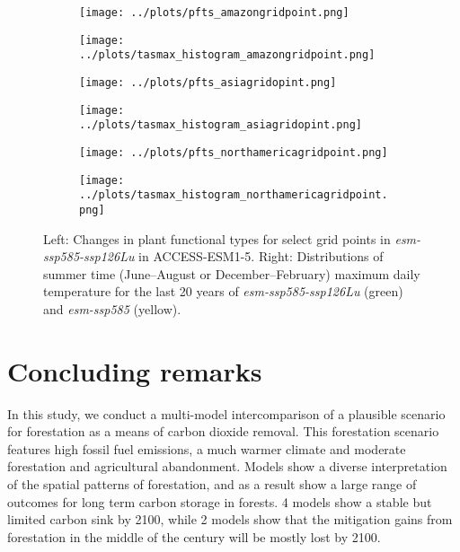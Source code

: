\documentclass[]{article}
\begin{document}
\begin{figure}[H]
    \centering
    \begin{subfigure}[b]{0.4\linewidth}
        \texttt{[image: ../plots/pfts\_amazongridpoint.png]}
    \end{subfigure}
    \begin{subfigure}[b]{0.4\linewidth}
        \texttt{[image: ../plots/tasmax\_histogram\_amazongridpoint.png]}
    \end{subfigure}
    \begin{subfigure}[b]{0.4\linewidth}
        \texttt{[image: ../plots/pfts\_asiagridopint.png]}
    \end{subfigure}
    \begin{subfigure}[b]{0.4\linewidth}
        \texttt{[image: ../plots/tasmax\_histogram\_asiagridopint.png]}
    \end{subfigure}
    \begin{subfigure}[b]{0.4\linewidth}
        \texttt{[image: ../plots/pfts\_northamericagridpoint.png]}
    \end{subfigure}
    \begin{subfigure}[b]{0.4\linewidth}
        \texttt{[image: ../plots/tasmax\_histogram\_northamericagridpoint.png]}
    \end{subfigure}
    \caption{Left: Changes in plant functional types for select grid points in \textit{esm-ssp585-ssp126Lu} in ACCESS-ESM1-5. Right: Distributions of summer time (June--August or December--February) maximum daily temperature for the last 20 years of \textit{esm-ssp585-ssp126Lu} (green) and \textit{esm-ssp585} (yellow).}
    \label{fig:tasmax_distribution}
\end{figure}

\section{Concluding remarks}

In this study, we conduct a multi-model intercomparison of a plausible scenario for forestation as a means of carbon dioxide removal.
This forestation scenario features high fossil fuel emissions, a much warmer climate and moderate forestation and agricultural abandonment.
Models show a diverse interpretation of the spatial patterns of forestation, and as a result show a large range of outcomes for long term carbon storage in forests.
4 models show a stable but limited carbon sink by 2100, while 2 models show that the mitigation gains from forestation in the middle of the century will be mostly lost by 2100.
\end{document}
